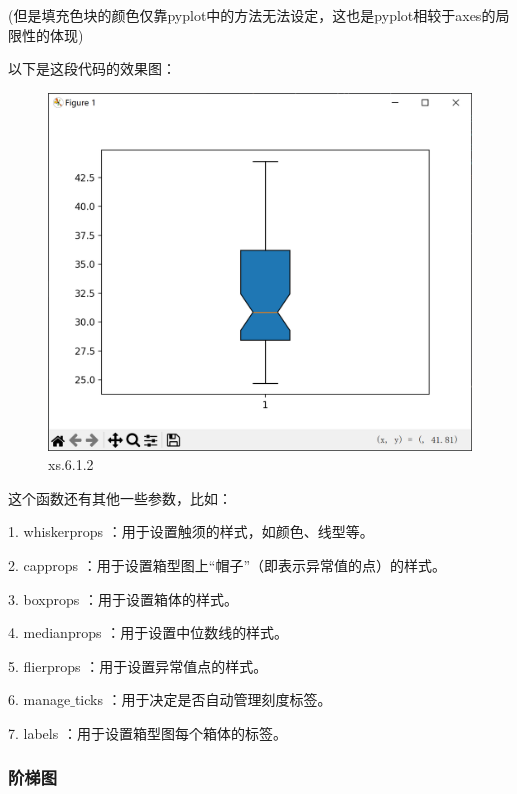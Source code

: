 \documentclass[12pt]{article}
\begin{document}
\noindent (但是填充色块的颜色仅靠pyplot中的方法无法设定，这也是pyplot相较于axes的局限性的体现)

以下是这段代码的效果图：
\begin{figure}[H]
    \centering
    \includegraphics[width=0.75\linewidth]{箱型图 Pic1.png}
    \caption{xs.6.1.2}
    \label{fig:enter-label}
\end{figure}
这个函数还有其他一些参数，比如：

1. whiskerprops  ：用于设置触须的样式，如颜色、线型等。

2. capprops  ：用于设置箱型图上“帽子”（即表示异常值的点）的样式。

3. boxprops  ：用于设置箱体的样式。

4. medianprops  ：用于设置中位数线的样式。

5. flierprops  ：用于设置异常值点的样式。

6. manage$\_$ticks  ：用于决定是否自动管理刻度标签。

7. labels  ：用于设置箱型图每个箱体的标签。


\subsubsection{阶梯图}
\end{document}
